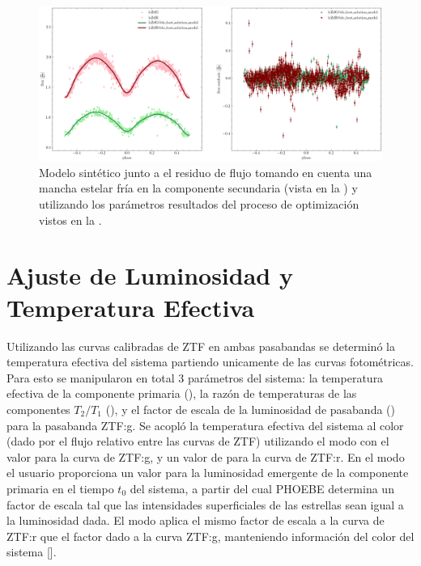 \begin{figure}[!ht]
	\centering
	\includegraphics[scale=0.5]{Metodologia/Secciones/ModeloComputacional/Figures/Figura Opt DC Resultados ZTF.png}
	\caption{Modelo sintético junto a el residuo de flujo tomando en cuenta una
	mancha estelar fría en la componente secundaria (vista en la
	) y utilizando los parámetros resultados del
	proceso de optimización vistos en la .}
	\label{figuraOptDcResultadosZtf}
\end{figure}

\section{Ajuste de Luminosidad y Temperatura Efectiva}

Utilizando las curvas calibradas de ZTF en ambas pasabandas se determinó la
temperatura efectiva del sistema partiendo unicamente de las curvas
fotométricas. Para esto se manipularon en total 3 parámetros del sistema: la
temperatura efectiva de la componente primaria (), la razón
de temperaturas de las componentes $T_2 / T_1$ (), y el factor
de escala de la luminosidad de pasabanda () para la
pasabanda ZTF:g. Se acopló la temperatura efectiva del sistema al color (dado
por el flujo relativo entre las curvas de ZTF) utilizando el modo
 con el valor  para la curva de ZTF:g,
y un valor de  para la curva de ZTF:r. En el modo
 el usuario proporciona un valor para la luminosidad
emergente de la componente primaria en el tiempo $t_0$ del sistema, a partir del
cual PHOEBE determina un factor de escala tal que las intensidades superficiales
de las estrellas sean igual a la luminosidad dada. El modo
 aplica el mismo factor de escala a la curva de ZTF:r que
el factor dado a la curva ZTF:g, manteniendo información del color del sistema
[]. 


